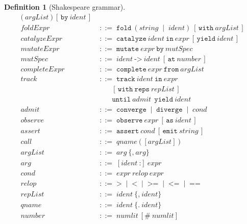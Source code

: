 \documentclass[11pt,a4paper]{article}
\theoremstyle{thmstyle}
\theoremstyle{definition}
\newtheorem{definition}[theorem]{Definition}
\theoremstyle{remark}
\newcommand{\bnf}{\;::=\;}
\newcommand{\alt}{\;\mid\;}
\newcommand{\shk}[1]{\texttt{#1}}
\begin{document}
\begin{definition}[Shakespeare grammar]
\begin{align*}
   \shk{(}\ \textit{argList}\ \shk{)}\ [\,\shk{by}\ \textit{ident}\,] \\[2pt]
\textit{foldExpr} &\bnf \shk{fold}\ (\textit{string}\alt\textit{ident})\
   [\,\shk{with}\ \textit{argList}\,] \\[2pt]
\textit{catalyzeExpr} &\bnf \shk{catalyze}\ \textit{ident}\ \shk{in}\
   \textit{expr}\ [\,\shk{yield}\ \textit{ident}\,] \\[2pt]
\textit{mutateExpr} &\bnf \shk{mutate}\ \textit{expr}\ \shk{by}\
   \textit{mutSpec} \\
\textit{mutSpec} &\bnf \textit{ident}\ \shk{->}\ \textit{ident}\
   [\,\shk{at}\ \textit{number}\,] \\[2pt]
\textit{completeExpr} &\bnf \shk{complete}\ \textit{expr}\ \shk{from}\
   \textit{argList} \\[2pt]
\textit{track} &\bnf \shk{track}\ \textit{ident}\ \shk{in}\ \textit{expr}
   \\
   &\qquad [\,\shk{with}\ \shk{reps}\ \textit{repList}\,]\ \\
   &\qquad \shk{until}\ \textit{admit}\ \ \shk{yield}\ \textit{ident} \\[2pt]
\textit{admit} &\bnf \shk{converge} \alt \shk{diverge} \alt \textit{cond}
   \\[2pt]
\textit{observe} &\bnf \shk{observe}\ \textit{expr}\
   [\,\shk{as}\ \textit{ident}\,] \\[2pt]
\textit{assert} &\bnf \shk{assert}\ \textit{cond}\
   [\,\shk{emit}\ \textit{string}\,] \\[2pt]
\textit{call} &\bnf \textit{qname}\ \shk{(}\ [\textit{argList}]\ \shk{)} \\
\textit{argList} &\bnf \textit{arg}\ \{\shk{,}\ \textit{arg}\} \\
\textit{arg} &\bnf [\textit{ident}\ \shk{:}]\ \textit{expr} \\[2pt]
\textit{cond} &\bnf \textit{expr}\ \textit{relop}\ \textit{expr} \\
\textit{relop} &\bnf \shk{>} \alt \shk{<} \alt \shk{>=} \alt \shk{<=}
   \alt \shk{==} \\[2pt]
\textit{repList} &\bnf \textit{ident}\ \{\shk{,}\ \textit{ident}\} \\
\textit{qname} &\bnf \textit{ident}\ \{\shk{.}\ \textit{ident}\} \\
\textit{number} &\bnf \textit{numlit}\ [\shk{\#}\ \textit{numlit}]
\end{align*}
\end{definition}
\end{document}
